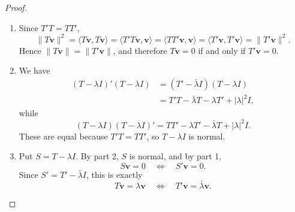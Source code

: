 \begin{proof}
\begin{enumerate}[label=\arabic*.]
\item Since $T'T=TT'$,
\[
\|T\mathbf v\|^2
=\langle T\mathbf v,T\mathbf v\rangle
=\langle T'T\mathbf v,\mathbf v\rangle
=\langle TT'\mathbf v,\mathbf v\rangle
=\langle T'\mathbf v,T'\mathbf v\rangle
=\|T'\mathbf v\|^2.
\]
Hence $\|T\mathbf v\|=\|T'\mathbf v\|$, and therefore $T\mathbf v=0$ if and only if $T'\mathbf v=0$.

\item We have
\begin{align*}
(T-\lambda I)'(T-\lambda I)
&=(T'-\bar\lambda I)(T-\lambda I)\\
&=T'T-\bar\lambda T-\lambda T'+|\lambda|^2I,
\end{align*}
while
\[
(T-\lambda I)(T-\lambda I)'
=TT'-\lambda T'-\bar\lambda T+|\lambda|^2I.
\]
These are equal because $T'T=TT'$, so $T-\lambda I$ is normal.

\item Put $S=T-\lambda I$. By part 2, $S$ is normal, and by part 1,
\[
S\mathbf v=0\quad\Longleftrightarrow\quad S'\mathbf v=0.
\]
Since $S'=T'-\bar\lambda I$, this is exactly
\[
T\mathbf v=\lambda\mathbf v
\quad\Longleftrightarrow\quad
T'\mathbf v=\bar\lambda\mathbf v.
\]
\end{enumerate}
\end{proof}

